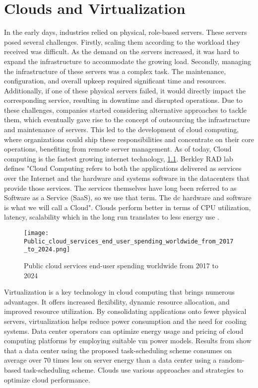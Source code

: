 \documentclass[
  a4paper,  %
  twoside,  %
  bibliography=totoc,
  headsepline,
  cleardoublepage=empty,
  parskip=half,
  draft=false
]{scrbook}
\begin{document}

\chapter{Clouds and Virtualization}\label{chap6}

In the early days, industries relied on physical, role-based servers. These servers posed several challenges. Firstly, scaling them according to the workload they received was difficult. As the demand on the servers increased, it was hard to expand the infrastructure to accommodate the growing load. Secondly, managing the infrastructure of these servers was a complex task. The maintenance, configuration, and overall upkeep required significant time and resources. Additionally, if one of these physical servers failed, it would directly impact the corresponding service, resulting in downtime and disrupted operations. Due to these challenges, companies started considering alternative approaches to tackle them, which eventually gave rise to the concept of outsourcing the infrastructure and maintenance of servers. This led to the development of cloud computing, where organizations could ship these responsibilities and concentrate on their core operations, benefiting from remote server management. As of today, Cloud computing is the fastest growing internet technology, \ref{cloud_increase}\cite{anand2021need}. Berkley RAD lab defines "Cloud Computing refers to both the applications delivered as services over the Internet and the hardware and systems software in the datacenters that provide those services. The services themselves have long been referred to as Software as a Service (SaaS), so we use that term. The \gls{dc} hardware and software is what we will call a Cloud"\cite{fox2009above}.
Clouds perform better in terms of CPU utilization, latency, scalability which in the long run translates to less energy use \cite{khanghahi2013cloud}. 


\begin{figure}
	\centering
	\texttt{[image: Public\_cloud\_services\_end\_user\_spending\_worldwide\_from\_2017\_to\_2024.png]}
	\caption{Public cloud services end-user spending worldwide from 2017 to 2024\cite{cloud_economy2023}}
	\label{cloud_increase}
\end{figure}


Virtualization is a key technology in cloud computing that brings numerous advantages. It offers increased flexibility, dynamic resource allocation, and improved resource utilization. By consolidating applications onto fewer physical servers, virtualization helps reduce power consumption and the need for cooling systems. Data center operators can optimize energy usage and pricing of cloud computing platforms by employing suitable \gls{vm} power models. Results from \cite{6679892} show that a data center using the proposed task-scheduling scheme consumes on average over 70 times less on server energy than a data center using a random-based task-scheduling scheme. Clouds use various approaches and strategies to optimize cloud performance\cite{alzakholi2020comparison}.
\end{document}
